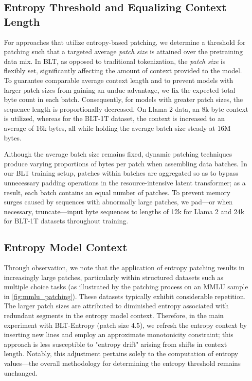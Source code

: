 \subsection{Entropy Threshold and Equalizing Context Length} For approaches that utilize entropy-based patching, we determine a threshold for patching such that a targeted average \textit{patch size} is attained over the pretraining data mix. In {\textsc BLT}, as opposed to traditional tokenization, the \textit{patch size} is flexibly set, significantly affecting the amount of context provided to the model. To guarantee comparable average context length and to prevent models with larger patch sizes from gaining an undue advantage, we fix the expected total byte count in each batch. Consequently, for models with greater patch sizes, the sequence length is proportionally decreased. On Llama 2 data, an 8k byte context is utilized, whereas for the {\textsc BLT}-1T dataset, the context is increased to an average of 16k bytes, all while holding the average batch size steady at 16M bytes.

Although the average batch size remains fixed, dynamic patching techniques produce varying proportions of bytes per patch when assembling data batches. In our {\textsc BLT} training setup, patches within batches are aggregated so as to bypass unnecessary padding operations in the resource-intensive latent transformer; as a result, each batch contains an equal number of patches. To prevent memory surges caused by sequences with abnormally large patches, we pad—or when necessary, truncate—input byte sequences to lengths of 12k for Llama 2 and 24k for {\textsc BLT}-1T datasets throughout training.

\subsection{Entropy Model Context}
\label{section:entropy-context}
Through observation, we note that the application of entropy patching results in increasingly large patches, particularly within structured datasets such as multiple choice tasks (as illustrated by the patching process on an MMLU sample in \autoref{fig:mmlu_patching}). These datasets typically exhibit considerable repetition. The larger patch sizes are attributed to diminished entropy associated with redundant segments in the entropy model context. Therefore, in the main experiment with {\textsc BLT}-Entropy (patch size 4.5), we refresh the entropy context by inserting new lines and employ an approximate monotonicity constraint; this approach is less susceptible to "entropy drift" arising from shifts in context length. Notably, this adjustment pertains solely to the computation of entropy values—the overall methodology for determining the entropy threshold remains unchanged.

